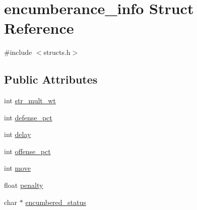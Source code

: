 \hypertarget{structencumberance__info}{\section{encumberance\-\_\-info Struct Reference}
\label{structencumberance__info}
}


{\ttfamily \#include $<$structs.\-h$>$}

\subsection*{Public Attributes}
\begin{DoxyCompactItemize}
\item 
int \hyperlink{structencumberance__info_aa2ea8e741a58ad10c50eb074fb35bfb2}{str\-\_\-mult\-\_\-wt}
\item 
int \hyperlink{structencumberance__info_af06509d4e25c3b78fc3e33f8b707d499}{defense\-\_\-pct}
\item 
int \hyperlink{structencumberance__info_aab6d07743a554bf638808d3b03f32b85}{delay}
\item 
int \hyperlink{structencumberance__info_add8426edbd9a6eecfb81c2fa07a7ad75}{offense\-\_\-pct}
\item 
int \hyperlink{structencumberance__info_a88e17151ed64a63d9d0333949f0dc988}{move}
\item 
float \hyperlink{structencumberance__info_a2d805428c874845ca9df5a9c8d3b6345}{penalty}
\item 
char $\ast$ \hyperlink{structencumberance__info_afaf76f823787c7af302e587b657c096a}{encumbered\-\_\-status}
\end{DoxyCompactItemize}



